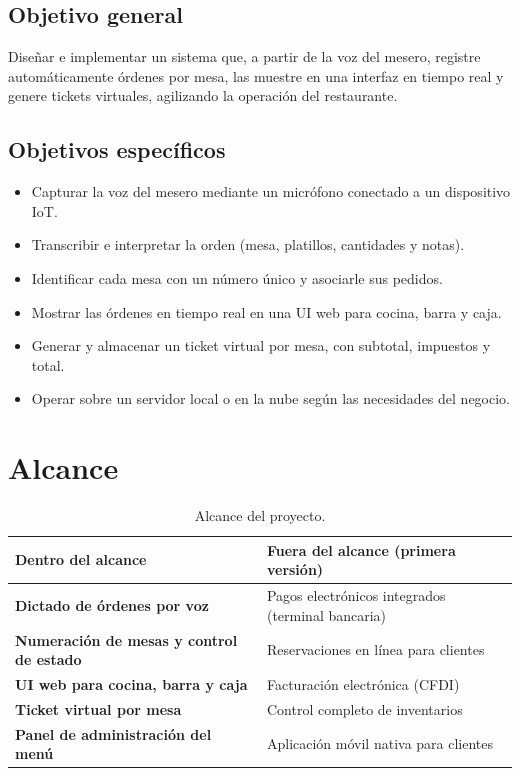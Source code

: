 \documentclass[11pt,letterpaper]{article}
\newcommand{\tabhead}[1]{\textbf{\color{white}#1}}
\newcommand{\encabezado}{\rowcolor{azulprincipal}}
\begin{document}
\subsection{Objetivo general}
Diseñar e implementar un sistema que, a partir de la voz del mesero, registre automáticamente órdenes por mesa, las muestre en una interfaz en tiempo real y genere tickets virtuales, agilizando la operación del restaurante.

\subsection{Objetivos específicos}
\begin{itemize}[noitemsep]
  \item Capturar la voz del mesero mediante un micrófono conectado a un dispositivo IoT.
  \item Transcribir e interpretar la orden (mesa, platillos, cantidades y notas).
  \item Identificar cada mesa con un número único y asociarle sus pedidos.
  \item Mostrar las órdenes en tiempo real en una UI web para cocina, barra y caja.
  \item Generar y almacenar un ticket virtual por mesa, con subtotal, impuestos y total.
  \item Operar sobre un servidor local o en la nube según las necesidades del negocio.
\end{itemize}

\section{Alcance}
\begin{table}[h!]
\centering
\begin{tabularx}{\textwidth}{>{\bfseries}l X}
\toprule
\encabezado \tabhead{Dentro del alcance} & \tabhead{Fuera del alcance (primera versión)} \\
\midrule
Dictado de órdenes por voz & Pagos electrónicos integrados (terminal bancaria) \\
Numeración de mesas y control de estado & Reservaciones en línea para clientes \\
UI web para cocina, barra y caja & Facturación electrónica (CFDI) \\
Ticket virtual por mesa & Control completo de inventarios \\
Panel de administración del menú & Aplicación móvil nativa para clientes \\
\bottomrule
\end{tabularx}
\caption{Alcance del proyecto.}
\end{table}
\end{document}
